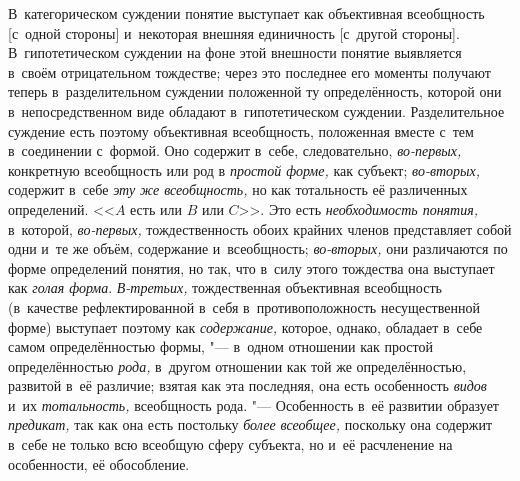 В~категорическом суждении понятие выступает как объективная
всеобщность [с~одной стороны] и~некоторая внешняя единичность [с~другой
стороны]. В~гипотетическом суждении на фоне этой внешности понятие
выявляется в~своём отрицательном тождестве; через это последнее его моменты
получают теперь в~разделительном суждении положенной ту определённость,
которой они в~непосредственном виде обладают в~гипотетическом суждении.
Разделительное суждение есть поэтому объективная всеобщность, положенная
вместе с~тем в~соединении с~формой. Оно содержит в~себе, следовательно,
{\em во-первых,} конкретную всеобщность или род в {\em простой форме,} как
субъект; {\em во-вторых,} содержит в~себе {\em эту
же всеобщность,} но как тотальность её
различенных определений. <<$A$ есть или $B$ или $C$>>. Это есть
{\em необходимость понятия,} в~которой, {\em во-первых,}
тождественность обоих крайних членов представляет собой одни
и~те же объём, содержание и~всеобщность;
{\em во-вторых,} они
различаются по форме определений понятия, но так, что в~силу этого
тождества она выступает как {\em голая
форма}. {\em В-третьих,}
тождественная объективная всеобщность (в~качестве
рефлектированной в~себя в~противоположность несущественной форме) выступает
поэтому как {\em содержание,}
которое, однако, обладает в~себе самом определённостью
формы, "--- в~одном отношении как простой определённостью
{\em рода,} в~другом
отношении как той же определённостью, развитой в~её различие; взятая как
эта последняя, она есть особенность {\em видов} и~их {\em тотальность,}
всеобщность рода. "--- Особенность в~её развитии
образует {\em предикат,} так как она есть постольку {\em более всеобщее,}
поскольку она содержит в~себе не только всю всеобщую сферу
субъекта, но и~её расчленение на особенности, её обособление.

